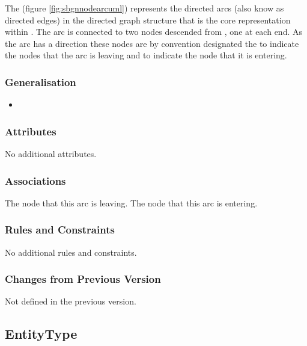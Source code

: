 The  (figure \ref{fig:sbgnnodearcuml}) represents
the directed arcs (also know as directed edges) in the directed graph
structure that is the core representation within \PDl. The arc is
connected to two nodes descended from , one at
each end. As the arc has a direction these nodes are by convention
designated the  to indicate the nodes that the arc
is leaving and  to indicate the node that it is
entering.

\subsubsection{Generalisation}

\begin{itemize}
\item {}
\end{itemize}

\subsubsection{Attributes}

No additional attributes.

\subsubsection{Associations}

\begin{attributes}
   The node that this arc is leaving.
   The node that this arc is entering.
\end{attributes}

\subsubsection{Rules and Constraints}

No additional rules and constraints.

\subsubsection{Changes from Previous Version}

Not defined in the previous version.


\subsection{EntityType}
\label{defn:EntityType}

